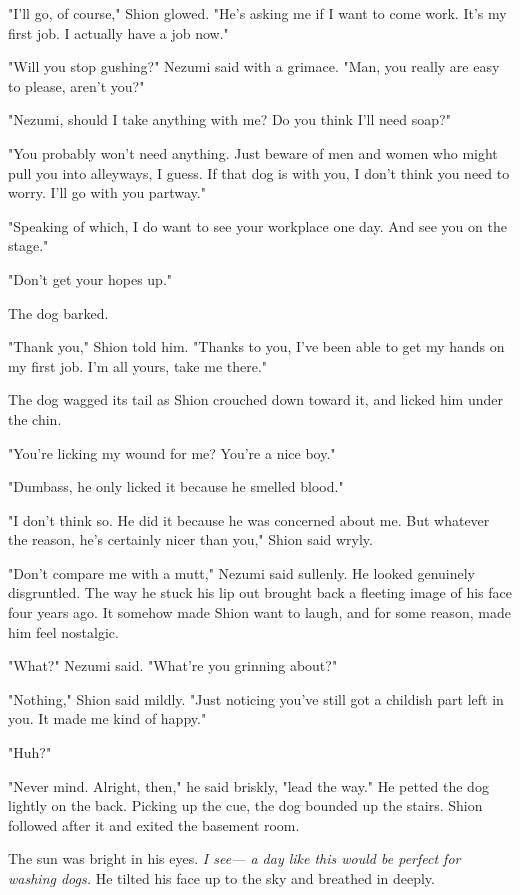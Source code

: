 "I'll go, of course," Shion glowed. "He's asking me if I want to come
work. It's my first job. I actually have a job now."

"Will you stop gushing?" Nezumi said with a grimace. "Man, you really
are easy to please, aren't you?"

"Nezumi, should I take anything with me? Do you think I'll need soap?"

"You probably won't need anything. Just beware of men and women who
might pull you into alleyways, I guess. If that dog is with you, I don't
think you need to worry. I'll go with you partway."

"Speaking of which, I do want to see your workplace one day. And see you
on the stage."

"Don't get your hopes up."

The dog barked.

"Thank you," Shion told him. "Thanks to you, I've been able to get my
hands on my first job. I'm all yours, take me there."

The dog wagged its tail as Shion crouched down toward it, and licked him
under the chin.

"You're licking my wound for me? You're a nice boy."

"Dumbass, he only licked it because he smelled blood."

"I don't think so. He did it because he was concerned about me. But
whatever the reason, he's certainly nicer than you," Shion said wryly.

"Don't compare me with a mutt," Nezumi said sullenly. He looked
genuinely disgruntled. The way he stuck his lip out brought back a
fleeting image of his face four years ago. It somehow made Shion want to
laugh, and for some reason, made him feel nostalgic.

"What?" Nezumi said. "What're you grinning about?"

"Nothing," Shion said mildly. "Just noticing you've still got a childish
part left in you. It made me kind of happy."

"Huh?"

"Never mind. Alright, then," he said briskly, "lead the way." He petted
the dog lightly on the back. Picking up the cue, the dog bounded up the
stairs. Shion followed after it and exited the basement room.

The sun was bright in his eyes.\emph{ I see--- a day like this would be perfect
for washing dogs.} He tilted his face up to the sky and breathed in
deeply.

